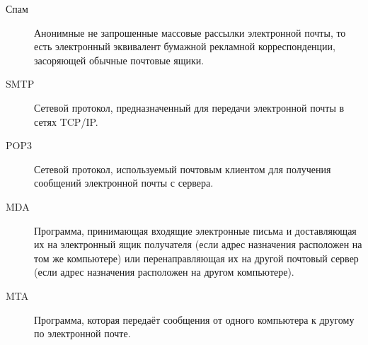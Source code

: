 \Defines %
\begin{description}
\item[Спам] Анонимные не запрошенные массовые рассылки электронной почты, то есть электронный эквивалент бумажной рекламной корреспонденции, засоряющей обычные почтовые ящики.
\item[SMTP] Сетевой протокол, предназначенный для передачи электронной почты в сетях TCP/IP.
\item[POP3] Сетевой протокол, используемый почтовым клиентом для получения сообщений электронной почты с сервера.
\item[MDA] Программа, принимающая входящие электронные письма и доставляющая их на электронный ящик получателя (если адрес назначения расположен на том же компьютере) или перенаправляющая их на другой почтовый сервер (если адрес назначения расположен на другом компьютере).
\item[MTA] Программа, которая передаёт сообщения от одного компьютера к другому по электронной почте.
\
\end{description}

